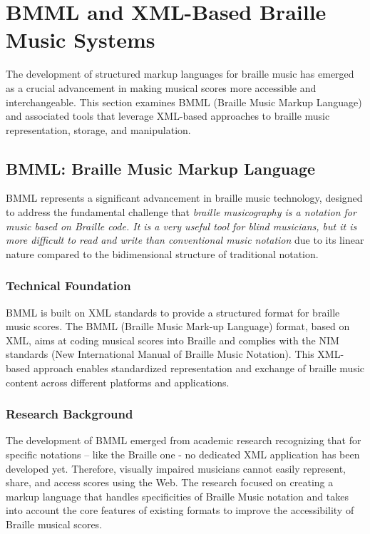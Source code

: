 \section{BMML and XML-Based Braille Music Systems}

The development of structured markup languages for braille music has emerged as a crucial advancement in making musical scores more accessible and interchangeable. This section examines BMML (Braille Music Markup Language) and associated tools that leverage XML-based approaches to braille music representation, storage, and manipulation.

\subsection{BMML: Braille Music Markup Language}

BMML represents a significant advancement in braille music technology, designed to address the fundamental challenge that \textit{braille musicography is a notation for music based on Braille code. It is a very useful tool for blind musicians, but it is more difficult to read and write than conventional music notation} due to its linear nature compared to the bidimensional structure of traditional notation.

\subsubsection{Technical Foundation}
BMML is built on XML standards to provide a structured format for braille music scores. The BMML (Braille Music Mark-up Language) format, based on XML, aims at coding musical scores into Braille and complies with the NIM standards (New International Manual of Braille Music Notation). This XML-based approach enables standardized representation and exchange of braille music content across different platforms and applications.

\subsubsection{Research Background}
The development of BMML emerged from academic research recognizing that for specific notations – like the Braille one - no dedicated XML application has been developed yet. Therefore, visually impaired musicians cannot easily represent, share, and access scores using the Web. The research focused on creating a markup language that handles specificities of Braille Music notation and takes into account the core features of existing formats to improve the accessibility of Braille musical scores.

